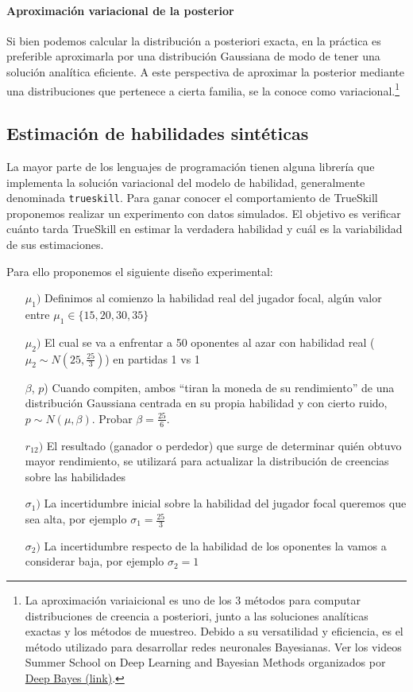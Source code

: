 \documentclass[a4paper,10pt]{article}
\begin{document}
\paragraph{Aproximaci\'on variacional de la posterior}

Si bien podemos calcular la distribuci\'on a posteriori exacta, en la pr\'actica es preferible aproximarla por una distribuci\'on Gaussiana de modo de tener una soluci\'on anal\'itica eficiente.
A este perspectiva de aproximar la posterior mediante una distribuciones que pertenece a cierta familia, se la conoce como variacional.\footnote{La aproximaci\'on variaicional es uno de los $3$ m\'etodos para computar distribuciones de creencia a posteriori, junto a las soluciones anal\'iticas exactas y los m\'etodos de muestreo. Debido a su versatilidad y eficiencia, es el m\'etodo utilizado para desarrollar redes neuronales Bayesianas. Ver los videos Summer School on Deep Learning and Bayesian Methods organizados por \href{https://deepbayes.ru/}{Deep Bayes (link)}.}

\subsection{Estimaci\'on de habilidades sint\'eticas}\label{ssec:estimacion}

La mayor parte de los lenguajes de programaci\'on tienen alguna librer\'ia que implementa la soluci\'on variacional del modelo de habilidad, generalmente denominada \texttt{trueskill}.
Para ganar conocer el comportamiento de TrueSkill proponemos realizar un experimento con datos simulados.
El objetivo es verificar cu\'anto tarda TrueSkill en estimar la verdadera habilidad y cu\'al es la variabilidad de sus estimaciones.

Para ello proponemos el siguiente diseño experimental: 

\begin{itemize}
 \item[$\mu_1)$] Definimos al comienzo la habilidad real del jugador focal, alg\'un valor entre $ \mu_1 \in \{15,20,30,35\}$
 \item[$\mu_2)$] El cual se va a enfrentar a 50 oponentes al azar con habilidad real ($\mu_2 \sim N(25,\frac{25}{3})$) en partidas 1 vs 1
 \item[$\beta$, $p$)] Cuando compiten, ambos ``tiran la moneda de su rendimiento'' de una distribuci\'on Gaussiana centrada en su propia habilidad y con cierto ruido, $p \sim N(\mu,\beta)$. Probar $\beta=\frac{25}{6}$.
 \item[$r_{12})$] El resultado (ganador o perdedor) que surge de determinar qui\'en obtuvo mayor rendimiento, se utilizar\'a para actualizar la distribuci\'on de creencias sobre las habilidades
 \item[$\sigma_1)$] La incertidumbre inicial sobre la habilidad del jugador focal queremos que sea alta, por ejemplo $\sigma_1 = \frac{25}{3}$
 \item[$\sigma_2)$] La incertidumbre respecto de la habilidad de los oponentes la vamos a considerar baja, por ejemplo $\sigma_2=1$
\end{itemize}
\end{document}

